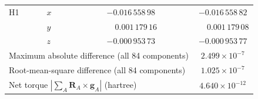 \begin{table}[htbp]
\begin{tabular}{llcc}
    H1 & $x$ & $-0.016\,558\,98$ & $-0.016\,558\,82$ \\
       & $y$ & $\phantom{-}0.001\,179\,16$ & $\phantom{-}0.001\,179\,08$ \\
       & $z$ & $-0.000\,953\,73$ & $-0.000\,953\,77$ \\
    \hline
    \multicolumn{3}{l}{Maximum absolute difference (all 84 components)} & $2.499 \times 10^{-7}$ \\
    \multicolumn{3}{l}{Root-mean-square difference (all 84 components)} & $1.025 \times 10^{-7}$ \\
    \multicolumn{3}{l}{Net torque $|\sum_A \mathbf{R}_A \times \mathbf{g}_A|$ (hartree)} & $4.640 \times 10^{-12}$ \\
    \hline
  \end{tabular}
\end{table}
